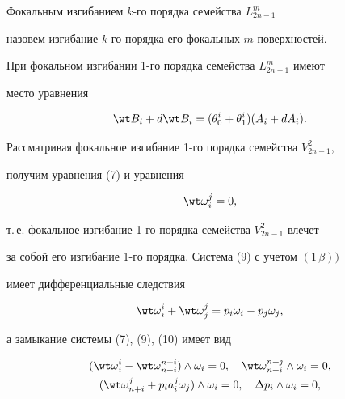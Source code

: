  


\begin{defn} 


Фокальным изгибанием $k$-го порядка семейства $L^m_{2n-1}$ 


назовем изгибание $k$-го порядка его фокальных $m$-поверхностей. 


\end{defn} 


 


При фокальном изгибании 1-го порядка семейства $L^m_{2n-1}$ имеют


место уравнения 


$$ 


\wt B_i+d\wt B_i=(\theta^i_0+\theta^i_1) 


(A_i+d A_i). 


$$ 


 


Рассматривая фокальное изгибание 1-го порядка семейства $V^2_{2n-1}$, 


получим уравнения (7) и уравнения 


\begin{equation} 


\wt\omega{}^j_i=0, 


\end{equation} 


т.\,е. фокальное изгибание 1-го порядка семейства $V^2_{2n-1}$ влечет 


за собой его изгибание 1-го порядка. Система (9) с учетом $(1\,\beta))$ 


имеет дифференциальные следствия 


\begin{equation} 


\wt\omega{}^i_i+\wt\omega{}^j_j= 


p_i\omega_i-p_j\omega_j, 


\end{equation} 


а замыкание системы (7), (9), (10) имеет вид 


\begin{gather} 


(\wt\omega{}^i_i-\wt\omega{}^{n+i}_{n+i}) 


\wedge\omega_i=0,\quad \wt\omega{}^{n+j}_{n+i} 


\wedge\omega_i=0, \\ 


%


(\wt\omega{}^j_{n+i}+p_i a^j_i\omega_j) 


\wedge\omega_i=0,\quad \Delta p_i\wedge\omega_i=0, 


\end{gather} 


